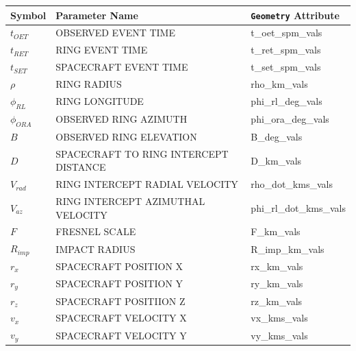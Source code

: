 \documentclass[titlepage, 12pt]{article}
\begin{document}
            \begin{table}[H]
                \centering
                \begin{tabular}{l l l} 
                    \hline
                    Symbol&Parameter Name
                          &\texttt{Geometry} Attribute\\
                    \hline
                    $t_{OET}$&OBSERVED EVENT TIME
                             &t\_oet\_spm\_vals\\
                    $t_{RET}$&RING EVENT TIME
                             &t\_ret\_spm\_vals\\
                    $t_{SET}$&SPACECRAFT EVENT TIME
                             &t\_set\_spm\_vals\\
                    $\rho$&RING RADIUS
                          &rho\_km\_vals\\
                    $\phi_{RL}$&RING LONGITUDE
                               &phi\_rl\_deg\_vals\\
                    $\phi_{ORA}$&OBSERVED RING AZIMUTH
                                & phi\_ora\_deg\_vals\\
                    $B$&OBSERVED RING ELEVATION
                       &B\_deg\_vals\\
                    $D$&SPACECRAFT TO RING INTERCEPT DISTANCE
                       &D\_km\_vals\\
                    $V_{rad}$&RING INTERCEPT RADIAL VELOCITY
                             &rho\_dot\_kms\_vals\\
                    $V_{az}$&RING INTERCEPT AZIMUTHAL VELOCITY
                            &phi\_rl\_dot\_kms\_vals\\
                    $F$&FRESNEL SCALE
                       &F\_km\_vals\\
                    $R_{imp}$&IMPACT RADIUS
                             &R\_imp\_km\_vals\\
                    $r_x$&SPACECRAFT POSITION X
                         &rx\_km\_vals\\
                    $r_y$&SPACECRAFT POSITION Y
                         &ry\_km\_vals\\
                    $r_z$&SPACECRAFT POSITIION Z
                         &rz\_km\_vals\\
                    $v_x$&SPACECRAFT VELOCITY X
                         &vx\_kms\_vals\\
                    $v_y$&SPACECRAFT VELOCITY Y
                         &vy\_kms\_vals\\

\end{tabular}
\end{table}
\end{document}

